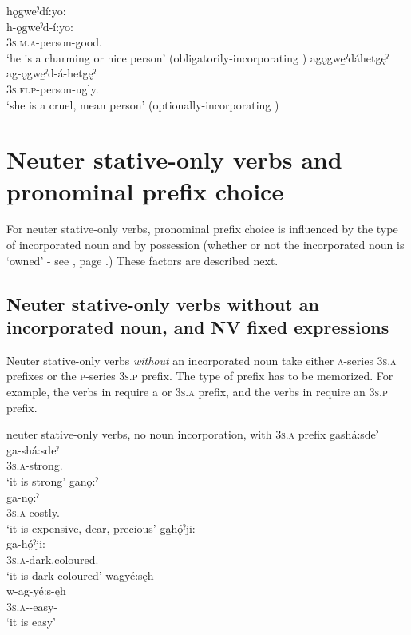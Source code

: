 \ea\label{ex:adjvbppchoicex15} 
\ea hǫgweˀdí:yo:\\
\gll h-ǫgweˀd-í:yo:\\
 \textsc{3s.m.a}-person-good.{\stative}  \\
\glt `he is a charming or nice person' (obligatorily-incorporating )
\ex agǫgwe̱ˀdáhetgęˀ\\
\gll ag-ǫgwe̱ˀd-á-hetgęˀ\\
 \textsc{3s.fi.p}-person-ugly.{\stative}  \\
\glt `she is a cruel, mean person' (optionally-incorporating )
\z
\z

\section{Neuter stative-only verbs and pronominal prefix choice} \label{Neuter stative-only verbs and pronominal prefix choice}
For neuter stative-only verbs, pronominal prefix choice is influenced by the type of incorporated noun and by possession (whether or not the incorporated noun is ‘owned’ -  see , page \pageref{figtab:1:pponeaspv}.) These factors are described next.

\subsection{Neuter stative-only verbs without an incorporated noun, and NV fixed expressions} \label{Neuter stative-only verbs without an incorporated noun, and NV fixed expressions}
Neuter stative-only verbs \emph{without} an incorporated noun take either \textsc{a}-series \linebreak {} \textsc{3s.a} prefixes or the \textsc{p}-series  \textsc{3s.p} prefix. The type of prefix has to be memorized. For example, the verbs in  require a  or  \textsc{3s.a} prefix, and the verbs in  require an  \textsc{3s.p} prefix.

\ea\label{ex:adjvbppchoicex3} neuter stative-only verbs, no noun incorporation, with  \textsc{3s.a} prefix
\ea gashá:sdeˀ\\
\gll ga-shá:sdeˀ\\
 \textsc{3s.a}-strong.{\stative}\\
\glt `it is strong'
\ex ganǫ:ˀ\\
\gll ga-nǫ:ˀ\\
 \textsc{3s.a}-costly.{\stative}\\
\glt `it is expensive, dear, precious'
\ex ga̱hǫ́ˀji:\\
\gll ga̱-hǫ́ˀji:\\
 \textsc{3s.a}-dark.coloured.{\stative}\\
\glt `it is dark-coloured'
\ex wagyé:sęh\\
\gll w-ag-yé:s-ęh\\
 \textsc{3s.a}-{\semireflexive}-easy-{\stative}\\
\glt `it is easy'
\z
\z

